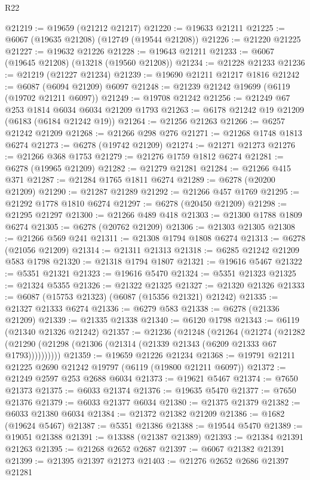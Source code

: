 \begin{lexlean}{R22}
\begin{coremodule}
@21219 := @19659 (@21212 @21217)
@21220 := @19633 @21211
@21225 := @6067 (@19635 @21208) (@12749 (@19544 @21208))
@21226 := @21220 @21225
@21227 := @19632 @21226
@21228 := @19643 @21211
@21233 := @6067 (@19645 @21208) (@13218 (@19560 @21208))
@21234 := @21228 @21233
@21236 := @21219 (@21227 @21234)
@21239 := @19690 @21211 @21217 @1816
@21242 := @6087 (@6094 @21209) @6097
@21248 := @21239 @21242 @19699 (@6119 (@19702 @21211 @6097))
@21249 := @19708 @21242
@21256 := @21249 @67 @253 @1814 @6034 @6034 @21209 @1793
@21263 := @6178 @21242 @19 @21209 (@6183 (@6184 @21242 @19))
@21264 := @21256 @21263
@21266 := @6257 @21242 @21209
@21268 := @21266 @298 @276
@21271 := @21268 @1748 @1813 @6274
@21273 := @6278 (@19742 @21209)
@21274 := @21271 @21273
@21276 := @21266 @368 @1753
@21279 := @21276 @1759 @1812 @6274
@21281 := @6278 (@19965 @21209)
@21282 := @21279 @21281
@21284 := @21266 @415 @371
@21287 := @21284 @1765 @1811 @6274
@21289 := @6278 (@20200 @21209)
@21290 := @21287 @21289
@21292 := @21266 @457 @1769
@21295 := @21292 @1778 @1810 @6274
@21297 := @6278 (@20450 @21209)
@21298 := @21295 @21297
@21300 := @21266 @489 @418
@21303 := @21300 @1788 @1809 @6274
@21305 := @6278 (@20762 @21209)
@21306 := @21303 @21305
@21308 := @21266 @569 @241
@21311 := @21308 @1794 @1808 @6274
@21313 := @6278 (@21056 @21209)
@21314 := @21311 @21313
@21318 := @6285 @21242 @21209 @583 @1798
@21320 := @21318 @1794 @1807
@21321 := @19616 @5467
@21322 := @5351 @21321
@21323 := @19616 @5470
@21324 := @5351 @21323
@21325 := @21324 @5355
@21326 := @21322 @21325
@21327 := @21320 @21326
@21333 := @6087 (@15753 @21323) (@6087 (@15356 @21321) @21242)
@21335 := @21327 @21333 @6274
@21336 := @6279 @583
@21338 := @6278 (@21336 @21209)
@21339 := @21335 @21338
@21340 := @6120 @1798
@21343 := @6119 (@21340 @21326 @21242)
@21357 := @21236
    (@21248
      (@21264
        (@21274
          (@21282 (@21290 (@21298 (@21306 (@21314 (@21339 @21343 (@6209 @21333 @67 @1793))))))))))
@21359 := @19659 @21226 @21234
@21368 := @19791 @21211 @21225 @2690 @21242 @19797 (@6119 (@19800 @21211 @6097))
@21372 := @21249 @2597 @253 @2688 @6034
@21373 := @19621 @5467
@21374 := @7650 @21373
@21375 := @6033 @21374
@21376 := @19635 @5470
@21377 := @7650 @21376
@21379 := @6033 @21377 @6034
@21380 := @21375 @21379
@21382 := @6033 @21380 @6034
@21384 := @21372 @21382 @21209
@21386 := @1682 (@19624 @5467)
@21387 := @5351 @21386
@21388 := @19544 @5470
@21389 := @19051 @21388
@21391 := @13388 (@21387 @21389)
@21393 := @21384 @21391 @21263
@21395 := @21268 @2652 @2687
@21397 := @6067 @21382 @21391
@21399 := @21395 @21397 @21273
@21403 := @21276 @2652 @2686 @21397 @21281

\end{coremodule}
\end{lexlean}
